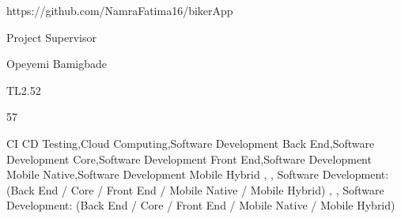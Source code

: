 \documentclass[twoside]{report}
\begin{document}
{https://github.com/NamraFatima16/bikerApp}

{Project Supervisor}

{}

{Opeyemi Bamigbade}

{TL2.52}

{57}

{CI CD Testing,Cloud Computing,Software Development Back End,Software Development Core,Software Development Front End,Software Development Mobile Native,Software Development Mobile Hybrid}
{, , Software Development: (Back End / Core / Front End / Mobile Native / Mobile Hybrid)}
{, , Software Development: (Back End / Core / Front End / Mobile Native / Mobile Hybrid)}

\endgroup

\DefaultLayout
\end{document}
